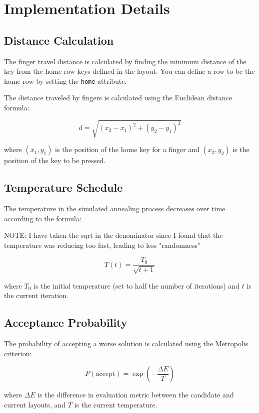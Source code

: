 \documentclass{article}
\begin{document}
\section{Implementation Details}

\subsection{Distance Calculation}
The finger travel distance is calculated by finding the minimum distance 
of the key from the home row keys defined in the layout. You can define a row
to be the home row by setting the \texttt{home} attribute.

The distance traveled by fingers is calculated using the Euclidean distance formula:

\begin{equation}
    d = \sqrt{(x_2 - x_1)^2 + (y_2 - y_1)^2}
\end{equation}

where $(x_1, y_1)$ is the position of the home key for a finger and $(x_2, y_2)$ is the position of the key to be pressed.

\subsection{Temperature Schedule}
The temperature in the simulated annealing process decreases over time according to the formula:

NOTE: I have taken the sqrt in the denominator since I found that the temperature
	was reducing too fast, leading to less "randomness"

\begin{equation}
    T(t) = \frac{T_0}{\sqrt{t + 1}}
\end{equation}

where $T_0$ is the initial temperature (set to half the number of iterations) and $t$ is the current iteration.

\subsection{Acceptance Probability}
The probability of accepting a worse solution is calculated using the Metropolis criterion:

\begin{equation}
    P(\text{accept}) = \exp(-\frac{\Delta E}{T})
\end{equation}

where $\Delta E$ is the difference in evaluation metric between the candidate and current layouts, and $T$ is the current temperature.
\end{document}
